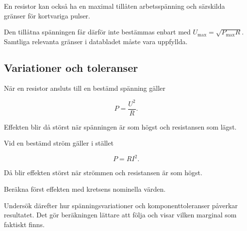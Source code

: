\documentclass[
  swedish,
  11pt,
  a4paper,
  DIV=11,
  numbers=noendperiod,
  twoside,
  open=any]{scrreprt}
\begin{document}
\begin{tcolorbox}[enhanced jigsaw, arc=.35mm, bottomrule=.15mm, bottomtitle=1mm, breakable, colback=white, colbacktitle=quarto-callout-important-color!10!white, colframe=quarto-callout-important-color-frame, coltitle=black, left=2mm, leftrule=.75mm, opacityback=0, opacitybacktitle=0.6, rightrule=.15mm, title=\textcolor{quarto-callout-important-color}{\faExclamation}\hspace{0.5em}{Effektgränsen är inte den enda begränsningen}, titlerule=0mm, toprule=.15mm, toptitle=1mm]

En resistor kan också ha en maximal tillåten arbetsspänning och
särskilda gränser för kortvariga pulser.

Den tillåtna spänningen får därför inte bestämmas enbart med
\(U_\mathrm{max} = \sqrt{P_\mathrm{max}R}\). Samtliga relevanta gränser
i databladet måste vara uppfyllda.

\end{tcolorbox}

\subsection{Variationer och
toleranser}\label{sec-effekt-variationer-och-toleranser}

När en resistor ansluts till en bestämd spänning gäller

\[
P = \frac{U^2}{R}.
\]

Effekten blir då störst när spänningen är som högst och resistansen som
lägst.

Vid en bestämd ström gäller i stället

\[
P = RI^2.
\]

Då blir effekten störst när strömmen och resistansen är som högst.

\begin{tcolorbox}[enhanced jigsaw, arc=.35mm, bottomrule=.15mm, bottomtitle=1mm, breakable, colback=white, colbacktitle=quarto-callout-tip-color!10!white, colframe=quarto-callout-tip-color-frame, coltitle=black, left=2mm, leftrule=.75mm, opacityback=0, opacitybacktitle=0.6, rightrule=.15mm, title=\textcolor{quarto-callout-tip-color}{\faLightbulb}\hspace{0.5em}{Börja med ett nominellt värde och undersök sedan värsta fallet}, titlerule=0mm, toprule=.15mm, toptitle=1mm]

Beräkna först effekten med kretsens nominella värden.

Undersök därefter hur spänningsvariationer och komponenttoleranser
påverkar resultatet. Det gör beräkningen lättare att följa och visar
vilken marginal som faktiskt finns.

\end{tcolorbox}
\end{document}
